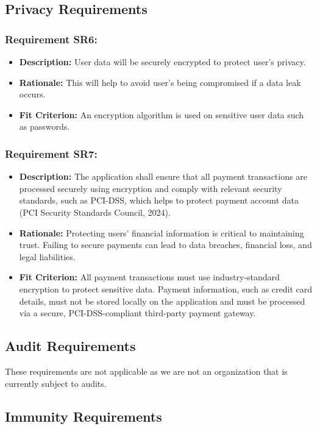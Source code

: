 \documentclass[12pt]{article}
\begin{document}
\subsection{Privacy Requirements}
\subsubsection*{Requirement SR6:}
\begin{itemize}
  \item \textbf{Description:} User data will be securely encrypted to protect user’s privacy.
  \item \textbf{Rationale:} This will help to avoid user's being compromised if a data leak occurs.
  \item \textbf{Fit Criterion:} An encryption algorithm is used on sensitive user data such as passwords.
\end{itemize}
\subsubsection*{Requirement SR7:}
\begin{itemize}
  \item \textbf{Description:} The application shall ensure that all payment transactions are processed securely using encryption and comply with relevant security standards, such as PCI-DSS, which helps to protect payment account data (PCI Security Standards Council, 2024).
  \item \textbf{Rationale:} Protecting users' financial information is critical to maintaining trust. Failing to secure payments can lead to data breaches, financial loss, and legal liabilities.
  \item \textbf{Fit Criterion:} All payment transactions must use industry-standard encryption to protect sensitive data. Payment information, such as credit card details, must not be stored locally on the application and must be processed via a secure, PCI-DSS-compliant third-party payment gateway.
\end{itemize}

\subsection{Audit Requirements}
These requirements are not applicable as we are not an organization that is currently subject to audits.
\subsection{Immunity Requirements}
\end{document}
